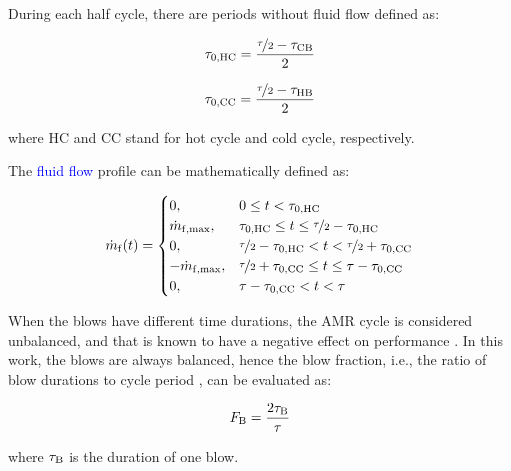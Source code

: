 \documentclass[referee]{svjour3}
\begin{document}
During each half cycle, there are periods without  fluid flow defined as:

\begin{equation}
\label{eq:48}
\tau_{\mathrm{0,HC}} = \frac{\nicefrac{\tau}{2} - \tau_{\mathrm{CB}}}{2}
\end{equation}

\begin{equation}
\label{eq:49}
\tau_{\mathrm{0,CC}} = \frac{\nicefrac{\tau}{2} - \tau_{\mathrm{HB}}}{2}
\end{equation}

where HC and CC stand for hot cycle and cold cycle, respectively.


The \textcolor{blue}{fluid flow} profile can be mathematically defined as:

\begin{equation}
\dot{m}_{\mathrm{f}}(t)=
\begin{cases}
0, & 0 \le t < \tau_{\mathrm{0,HC}} \\
\dot{m}_{\mathrm{f,max}}, & \tau_{\mathrm{0,HC}} \le t \le \nicefrac{\tau}{2} - \tau_{\mathrm{0,HC}} \\
0, & \nicefrac{\tau}{2} - \tau_{\mathrm{0,HC}} < t < \nicefrac{\tau}{2} + \tau_{\mathrm{0,CC}} \\
-\dot{m}_{\mathrm{f,max}}, & \nicefrac{\tau}{2} + \tau_{\mathrm{0,CC}} \le t \le \tau - \tau_{\mathrm{0,CC}} \\
0, &  \tau - \tau_{\mathrm{0,CC}} <  t < \tau \\
\end{cases}
\label{eq:50}
\end{equation}

When the blows have different time durations, the AMR cycle is considered unbalanced, and that is known to have a negative effect on performance \cite{bib:nakashima18-influen-exp, bib:eriksen16_effec}. In this work, the blows are always balanced, hence the blow fraction, i.e., the ratio of blow durations to cycle period \cite{bib:nakashima18-influen-exp}, can be evaluated as:

\begin{equation}
\label{eq:59}
F_{\mathrm{B}} = \frac{2\tau_{\mathrm{B}}}{\tau}
\end{equation}

\noindent where $\tau_{\mathrm{B}}$ is the duration of one blow.
\end{document}
